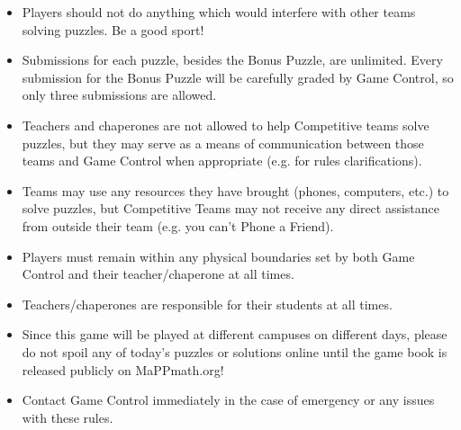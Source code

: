 
\begin{itemize}
\item Players should not do anything which
would interfere with other teams solving puzzles. Be a good sport!
\item Submissions for each puzzle, besides the Bonus Puzzle, are unlimited.
Every submission for the Bonus Puzzle will be carefully graded by Game Control,
so only three submissions are allowed.
\item Teachers and chaperones are not allowed to help Competitive teams solve
puzzles, but they may serve as a means of communication between those teams and
Game Control when appropriate (e.g. for rules clarifications).
\item Teams may use any resources they have brought (phones, computers, etc.)
to solve puzzles, but Competitive Teams may not receive any direct
assistance from outside their team (e.g. you can't Phone a Friend).
\item Players must remain within any physical boundaries set by both
Game Control and their teacher/chaperone at all times.
\item Teachers/chaperones are responsible for their students at
all times.
\item Since this game will be played at different campuses on different
days, please do not spoil any of today's puzzles or solutions online until
the game book is released publicly on MaPPmath.org!
\item Contact Game Control immediately in the case of emergency
or any issues with these rules.
\end{itemize}


